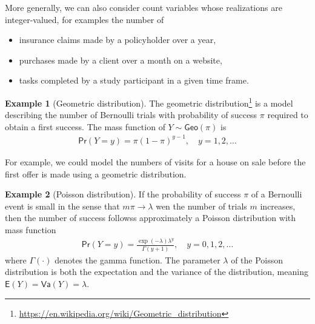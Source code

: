\documentclass[
  11pt,
  letterpaper,
]{book}
\providecommand{\tightlist}{%
  \setlength{\itemsep}{0pt}\setlength{\parskip}{0pt}}
\renewcommand{\href}[2]{#2\footnote{\url{#1}}}
\theoremstyle{definition}
\theoremstyle{definition}
\newtheorem{example}{Example}[chapter]
\theoremstyle{definition}
\theoremstyle{remark}
\begin{document}
More generally, we can also consider count variables whose realizations are integer-valued, for examples the number of

\begin{itemize}
\tightlist
\item
  insurance claims made by a policyholder over a year,
\item
  purchases made by a client over a month on a website,
\item
  tasks completed by a study participant in a given time frame.
\end{itemize}

\begin{example}[Geometric distribution]
\protect\hypertarget{exm:geomdist}{}{\label{exm:geomdist} {} }The \href{https://en.wikipedia.org/wiki/Geometric_distribution}{geometric distribution} is a model describing the number of Bernoulli trials with probability of success \(\pi\) required to obtain a first success. The mass function of \(Y \sim \mathsf{Geo}(\pi)\) is
\begin{align*}
\mathsf{Pr}(Y=y) = \pi (1-\pi)^{y-1}, \quad y=1,2, \ldots
\end{align*}

For example, we could model the numbers of visits for a house on sale before the first offer is made using a geometric distribution.
\end{example}

\begin{example}[Poisson distribution]
\protect\hypertarget{exm:poissondist}{}{\label{exm:poissondist} {} }If the probability of success \(\pi\) of a Bernoulli event is small in the sense that \(m\pi \to \lambda\) wen the number of trials \(m\) increases, then the number of success followss approximately a Poisson distribution with mass function
\begin{align*}
\mathsf{Pr}(Y=y) = \frac{\exp(-\lambda)\lambda^y}{\Gamma(y+1)}, \quad y=0, 1, 2, \ldots
\end{align*}
where \(\Gamma(\cdot)\) denotes the gamma function. The parameter \(\lambda\) of the Poisson distribution is both the expectation and the variance of the distribution, meaning \(\mathsf{E}(Y)=\mathsf{Va}(Y)=\lambda\).
\end{example}
\end{document}
